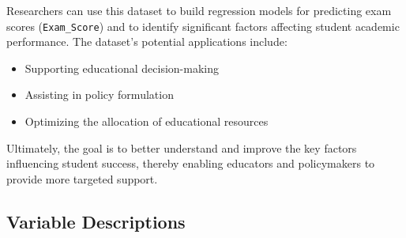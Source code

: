 \documentclass[twocolumn]{article} %
\begin{document}
Researchers can use this dataset to build regression models for
predicting exam scores (\texttt{Exam\_Score}) and to identify
significant factors affecting student academic performance. The
dataset's potential applications include:

\begin{itemize}
\item
    Supporting educational decision-making
\item
    Assisting in policy formulation
\item
    Optimizing the allocation of educational resources
\end{itemize}

Ultimately, the goal is to better understand and improve the key factors
influencing student success, thereby enabling educators and policymakers
to provide more targeted support.

\subsection*{Variable Descriptions}\label{variable-descriptions}
\end{document}
